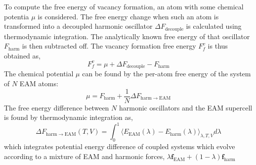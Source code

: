 \documentclass{article}
\begin{document}
To compute the free energy of vacancy formation, an atom with some chemical potentia $\mu$ is considered. The free energy change when such an atom is transformed into a decoupled harmonic oscillator $\Delta F_\mathrm{decouple}$ is calculated using thermodynamic integration. The analytically known free energy of that oscillator $F_\mathrm{harm}$ is then subtracted off. The vacancy formation free energy $F_f^v$ is thus obtained as,
%
\begin{equation} \label{eq:43}
F_f^v = \mu + \Delta F_\mathrm{decouple} - F_\mathrm{harm}
\end{equation}
%
The chemical potential $\mu$ can be found by the per-atom free energy of the system of $N$ EAM atoms:
%
\begin{equation} \label{eq:44}
\mu = F_\mathrm{harm} + \frac{1}{N}\Delta F_\mathrm{harm \rightarrow EAM}
\end{equation}
%
The free energy difference between $N$ harmonic oscillators and the EAM supercell is found by thermodynamic integration as,
%
\begin{equation} \label{eq:45}
\Delta F_\mathrm{harm \rightarrow EAM}(T, V) = \int_0^1 \langle E_\mathrm{EAM}(\lambda) - E_\mathrm{harm}(\lambda) \rangle_{\lambda, T, V} d\lambda
\end{equation}
%
which integrates potential energy difference of coupled systems which evolve according to a mixture of EAM and harmonic forces, $\lambda \bm{f}_\mathrm{EAM} + (1 - \lambda) \bm{f}_\mathrm{harm}$
\end{document}
